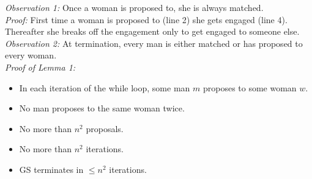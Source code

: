 \emph{Observation 1:} Once a woman is proposed to, she is always matched.\\
\emph{Proof:} First time a woman is proposed to (line 2) she gets engaged (line 4). Thereafter she breaks off the engagement only to get engaged to someone else.\\

\emph{Observation 2:} At termination, every man is either matched or has proposed to every woman.\\
\emph{Proof of Lemma 1:}
\begin{itemize}
\item In each iteration of the while loop, some man $m$ proposes to some woman $w$.
\item No man proposes to the same woman twice.
\item No more than $n^2$ proposals.
\item No more than $n^2$ iterations.
\item G{\textendash}S terminates in $\leq n^2$ iterations.
\end{itemize}